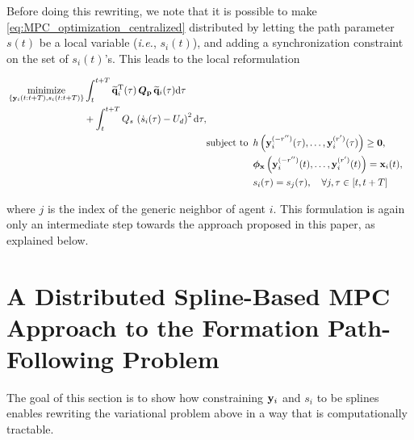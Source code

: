 Before doing this rewriting, we note that it is possible to make \eqref{eq:MPC_optimization_centralized} distributed by letting the path parameter $s(t)$ be a local variable (\emph{i.e.}, $s_i(t)$), and adding a synchronization constraint on the set of $s_i(t)$'s. This leads to the local reformulation

\begin{subequations}
    \begin{align}
        \begin{split}
            &\opt_{ \left\lbrace \mat{y}_i(t:t+T), s_i(t:t+T) \right\rbrace }
            \int_{t}^{t+T}
                \widetilde{\mat{q}}_i\T(\tau)
                \, \bm{Q}_{\mat{p}} \, 
                \widetilde{\mat{q}}_i(\tau)
                {\rm d}\tau \\
            & \qquad \qquad \qquad \qquad
            + \int_{t}^{t+T} Q_s \,\left(\dot{s}_i(\tau) - U_d\right)^2 {\rm d}\tau , 
        \end{split} \label{eq:MPC_criterion}\\
        & \text{subject to } \, h\left(\mat{y}_i^{(-r'')}(\tau), \ldots, \mat{y}^{(r')}_i(\tau)\right) \geq \bm{0}, \label{eq:MPC_constraint_h} \\
        & \phantom{\text{subject to } \,} \bm{\phi}_{\mat{x}} \left(\mat{y}_i^{(-r'')}(t), \ldots, \mat{y}^{(r')}_i(t)\right) = \mat{x}_{i}(t), \label{eq:MPC_constraint_x0} \\
        & \phantom{\text{subject to } \,} s_i(\tau) = s_j(\tau), \quad \forall j, \tau \in [t, t+T] \label{eq:MPC_constraint_gamma_s}
    \end{align}
\label{eq:MPC_optimization_distributed}

\end{subequations}

\noindent where $j$ is the index of the generic neighbor of agent $i$. This formulation is again only an intermediate step towards the approach proposed in this paper, as explained below. 



\section{A Distributed Spline-Based MPC Approach to the Formation Path-Following Problem}
\label{sec:MPC_spline-based-MPC}



The goal of this section is to show how constraining $\mathbf{y}_i$ and $s_i$ to be splines enables rewriting the variational problem above in a way that is computationally tractable.

